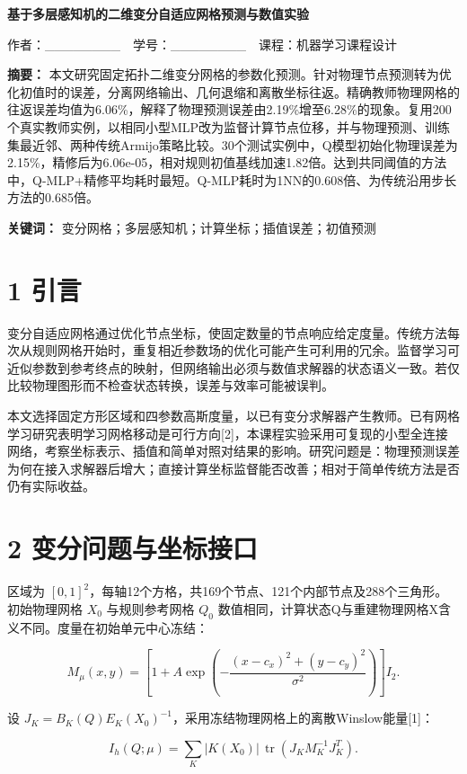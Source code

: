 \documentclass[UTF8,a4paper,zihao=5,fontset=fandol]{ctexart}
\begin{document}
\begin{center}{\LARGE\bfseries 基于多层感知机的二维变分自适应网格预测与数值实验}\end{center}

作者：\_\_\_\_\_\_\_\_　学号：\_\_\_\_\_\_\_\_　课程：机器学习课程设计


\textbf{摘要：} 本文研究固定拓扑二维变分网格的参数化预测。针对物理节点预测转为优化初值时的误差，分离网络输出、几何退缩和离散坐标往返。精确教师物理网格的往返误差均值为6.06\%，解释了物理预测误差由2.19\%增至6.28\%的现象。复用200个真实教师实例，以相同小型MLP改为监督计算节点位移，并与物理预测、训练集最近邻、两种传统Armijo策略比较。30个测试实例中，Q模型初始化物理误差为2.15\%，精修后为6.06e-05，相对规则初值基线加速1.82倍。达到共同阈值的方法中，Q-MLP+精修平均耗时最短。Q-MLP耗时为1NN的0.608倍、为传统沿用步长方法的0.685倍。


\textbf{关键词：} 变分网格；多层感知机；计算坐标；插值误差；初值预测


\section*{1 引言}

变分自适应网格通过优化节点坐标，使固定数量的节点响应给定度量。传统方法每次从规则网格开始时，重复相近参数场的优化可能产生可利用的冗余。监督学习可近似参数到参考终点的映射，但网络输出必须与数值求解器的状态语义一致。若仅比较物理图形而不检查状态转换，误差与效率可能被误判。


本文选择固定方形区域和四参数高斯度量，以已有变分求解器产生教师。已有网格学习研究表明学习网格移动是可行方向[2]，本课程实验采用可复现的小型全连接网络，考察坐标表示、插值和简单对照对结果的影响。研究问题是：物理预测误差为何在接入求解器后增大；直接计算坐标监督能否改善；相对于简单传统方法是否仍有实际收益。


\section*{2 变分问题与坐标接口}

区域为 $[0,1]^2$，每轴12个方格，共169个节点、121个内部节点及288个三角形。初始物理网格 $X_0$ 与规则参考网格 $Q_0$ 数值相同，计算状态Q与重建物理网格X含义不同。度量在初始单元中心冻结：


\[
M_\mu(x,y)=\left[1+A\exp\left(-\frac{(x-c_x)^2+(y-c_y)^2}{\sigma^2}\right)\right]I_2.
\]

设 $J_K=B_K(Q)E_K(X_0)^{-1}$，采用冻结物理网格上的离散Winslow能量[1]：


\[
I_h(Q;\mu)=\sum_K |K(X_0)|\,\operatorname{tr}\left(J_KM_K^{-1}J_K^T\right).
\]
\end{document}
